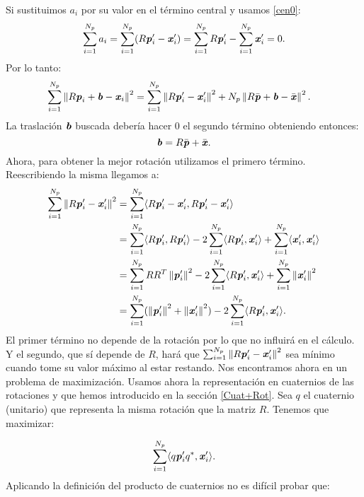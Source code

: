 		Si sustituimos $ a_i $ por su valor en el término central y usamos \eqref{cen0}:
		\begin{equation*}
			\sum_{i = 1}^{N_p} a_i = \sum_{i = 1}^{N_p} (R\textbf{\emph{p}}_i' -\textbf{\emph{x}}_i') = \sum_{i = 1}^{N_p} R\textbf{\emph{p}}_i' - \sum_{i = 1}^{N_p}\textbf{\emph{x}}_i' = 0.
		\end{equation*} 
		Por lo tanto: 
		\begin{equation*}
		\begin{split}
		\sum_{i = 1}^{N_p} \left\Vert R\textbf{\emph{p}}_i + \textbf{\emph{b}} - \textbf{\emph{x}}_i\right\Vert^2 &= \sum_{i = 1}^{N_p} \left\Vert R\textbf{\emph{p}}_i' -\textbf{\emph{x}}_i'\right\Vert^2 + N_p\left\Vert R\bar{\textbf{\emph{p}}}  + \textbf{\emph{b}} - \bar{\textbf{\emph{x}}}\right\Vert^2.
		\end{split}
		\end{equation*} 
		La traslación $ \textbf{\emph{b}} $ buscada debería hacer 0 el segundo término obteniendo entonces:
		\[\textbf{\emph{b}} = R\bar{\textbf{\emph{p}}}  + \bar{\textbf{\emph{x}}}.
		\]
		Ahora, para obtener la mejor rotación utilizamos el primero término. Reescribiendo la misma llegamos a:
		\begin{equation*}
		\begin{split}
		\sum_{i = 1}^{N_p} \left\Vert R\textbf{\emph{p}}_i' -\textbf{\emph{x}}_i'\right\Vert^2 &= \sum_{i = 1}^{N_p} \langle R\textbf{\emph{p}}_i' -\textbf{\emph{x}}_i', R\textbf{\emph{p}}_i' -\textbf{\emph{x}}_i' \rangle \\
		&= \sum_{i=1}^{N_p} \langle R \textbf{\emph{p}}_i' , R \textbf{\emph{p}}_i' \rangle - 2\sum_{i=1}^{N_p}\langle R\textbf{\emph{p}}_i', \textbf{\emph{x}}_i'\rangle + \sum_{i=1}^{N_p} \langle \textbf{\emph{x}}_i', \textbf{\emph{x}}_i'\rangle \\
		&= \sum_{i=1}^{N_p} RR^T \left\Vert\textbf{\emph{p}}_i'\right\Vert^2 - 2\sum_{i=1}^{N_p}\langle R\textbf{\emph{p}}_i', \textbf{\emph{x}}_i'\rangle + \sum_{i=1}^{N_p} \left\Vert\textbf{\emph{x}}_i'\right\Vert^2\\
		&= \sum_{i=1}^{N_p} (\left\Vert\textbf{\emph{p}}_i'\right\Vert^2 + \left\Vert\textbf{\emph{x}}_i'\right\Vert^2)- 2\sum_{i=1}^{N_p}\langle R\textbf{\emph{p}}_i', \textbf{\emph{x}}_i'\rangle.
		\end{split}
		\end{equation*}
		El primer término no depende de la rotación por lo que no influirá en el cálculo. Y el segundo, que sí depende de $ R $, hará que  $ \sum_{i = 1}^{N_p} \left\Vert R\textbf{\emph{p}}_i' -\textbf{\emph{x}}_i'\right\Vert^2 $ sea mínimo cuando tome su valor máximo al estar restando. Nos encontramos ahora en un problema de maximización. Usamos ahora la representación en cuaternios de las rotaciones y que hemos introducido en la sección \ref{Cuat+Rot}. Sea $ q  $ el cuaternio (unitario) que representa la misma rotación que la matriz $ R $. Tenemos que maximizar:
		
		\begin{equation*}
		\sum_{i=1}^{N_p}\langle q\textbf{\emph{p}}_i'q^*, \textbf{\emph{x}}_i'\rangle.
		\end{equation*}
		Aplicando la definición del producto de cuaternios no es difícil probar que: 
		
